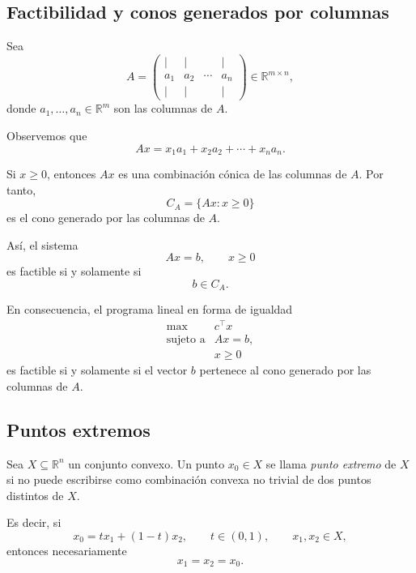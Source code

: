 \subsection{Factibilidad y conos generados por columnas}

Sea
\[
    A=
    \begin{pmatrix}
        \vert & \vert & & \vert\\
        a_1 & a_2 & \cdots & a_n\\
        \vert & \vert & & \vert
    \end{pmatrix}
    \in\mathbb{R}^{m\times n},
\]
donde \(a_1,\dots,a_n\in\mathbb{R}^m\) son las columnas de \(A\).

Observemos que
\[
    Ax
    =
    x_1a_1+x_2a_2+\cdots+x_na_n.
\]

Si \(x\geq 0\), entonces \(Ax\) es una combinación cónica de las columnas de \(A\). Por tanto,
\[
    C_A
    =
    \{Ax:x\geq 0\}
\]
es el cono generado por las columnas de \(A\).

Así, el sistema
\[
    Ax=b,\qquad x\geq 0
\]
es factible si y solamente si
\[
    b\in C_A.
\]

En consecuencia, el programa lineal en forma de igualdad
\[
    \begin{array}{ll}
        \max & c^\top x\\[1mm]
        \text{sujeto a} & Ax=b,\\
        & x\geq 0
    \end{array}
\]
es factible si y solamente si el vector \(b\) pertenece al cono generado por las columnas de \(A\).


\subsection{Puntos extremos}

\begin{definition}
Sea \(X\subseteq \mathbb{R}^n\) un conjunto convexo. Un punto \(x_0\in X\) se llama \emph{punto extremo} de \(X\) si no puede escribirse como combinación convexa no trivial de dos puntos distintos de \(X\).

Es decir, si
\[
    x_0=tx_1+(1-t)x_2,
    \qquad t\in(0,1),
    \qquad x_1,x_2\in X,
\]
entonces necesariamente
\[
    x_1=x_2=x_0.
\]
\end{definition}

